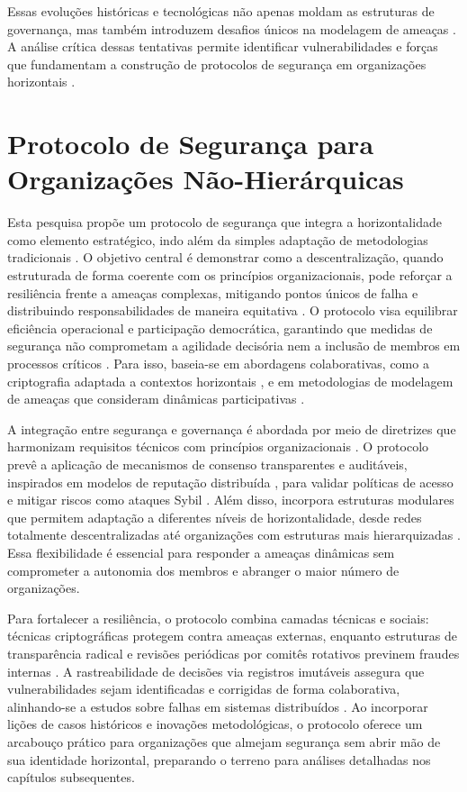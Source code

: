 Essas evoluções históricas e tecnológicas não apenas moldam as estruturas
de governança, mas também introduzem desafios únicos na modelagem de
ameaças \cite{DoArtifactsHavePolitics}. A análise crítica dessas tentativas permite identificar
vulnerabilidades e forças que fundamentam a construção de protocolos de
segurança em organizações horizontais \cite{Colbac}.

\section{Protocolo de Segurança para Organizações Não-Hierárquicas}
\label{sec:objetivos_pesquisa}

Esta pesquisa propõe um protocolo de segurança que integra a horizontalidade
como elemento estratégico, indo além da simples adaptação de metodologias
tradicionais \cite{Colbac}. O objetivo central é demonstrar como a descentralização, quando
estruturada de forma coerente com os princípios organizacionais, pode reforçar a
resiliência frente a ameaças complexas, mitigando pontos únicos de falha e
distribuindo responsabilidades de maneira equitativa \cite{ThreatModelingdesigningForSecurity}.
O protocolo visa equilibrar eficiência operacional e participação democrática, garantindo que
medidas de segurança não comprometam a agilidade decisória nem a inclusão de
membros em processos críticos \cite{Reputation-basedDAO}. Para isso, baseia-se em abordagens colaborativas,
como a criptografia adaptada a contextos horizontais \cite{Colbac}, e em
metodologias de modelagem de ameaças que consideram dinâmicas participativas
\cite{ParticipatoryThreatModelling}.

A integração entre segurança e governança é abordada por meio de diretrizes que
harmonizam requisitos técnicos com princípios organizacionais \cite{ParticipatoryThreatModelling}.
O protocolo prevê a aplicação de mecanismos de consenso transparentes e auditáveis, inspirados em
modelos de reputação distribuída \cite{Reputation-basedDAO}, para validar
políticas de acesso e mitigar riscos como ataques Sybil
\cite{MitigationSybilAttack}. Além disso, incorpora estruturas modulares que
permitem adaptação a diferentes níveis de horizontalidade, desde redes
totalmente descentralizadas até organizações com estruturas mais hierarquizadas
\cite{Colbac}. Essa flexibilidade é essencial para responder a ameaças
dinâmicas sem comprometer a autonomia dos membros e abranger o maior número de
organizações.

Para fortalecer a resiliência, o protocolo combina camadas técnicas e sociais:
técnicas criptográficas protegem contra ameaças externas, enquanto
estruturas de transparência radical e revisões periódicas por comitês
rotativos previnem fraudes internas \cite{EverydayRevolutions}. A rastreabilidade de decisões via
registros imutáveis assegura que vulnerabilidades sejam
identificadas e corrigidas de forma colaborativa, alinhando-se a estudos sobre
falhas em sistemas distribuídos \cite{Reputation-basedDAO}. Ao incorporar lições
de casos históricos e inovações metodológicas, o protocolo oferece um arcabouço
prático para organizações que almejam segurança sem abrir mão de sua identidade
horizontal, preparando o terreno para análises detalhadas nos capítulos
subsequentes.


